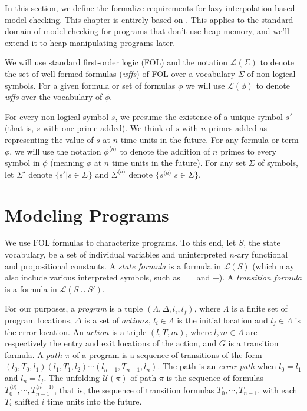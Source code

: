 \label{ch:background}

In this section, we define the formalize requirements for lazy interpolation-based model
checking. This chapter is entirely based on \cite{mcmillan06}. This applies to the
standard domain of model checking for programs that don't use heap memory, and we'll
extend it to heap-manipulating programs later.

We will use standard first-order logic (FOL) and the notation $\mathcal{L}(\Sigma)$ to
denote the set of well-formed formulas (\textit{wffs}) of FOL over a vocabulary $\Sigma$
of non-logical symbols. For a given formula or set of formulas $\phi$ we will use
$\mathcal{L}(\phi)$ to denote \textit{wffs} over the vocabulary of $\phi$.

For every non-logical symbol $s$, we presume the existence of a unique symbol $s'$ (that
is, $s$ with one prime added). We think of $s$ with $n$ primes added as representing the
value of $s$ at $n$ time units in the future. For any formula or term $\phi$, we will use
the notation $\phi^{\langle n \rangle}$ to denote the addition of $n$ primes to every
symbol in $\phi$ (meaning $\phi$ at $n$ time units in the future). For any set $\Sigma$ of
symbols, let $\Sigma'$ denote $\{ s' | s \in \Sigma \}$ and $\Sigma^{\langle n \rangle}$
denote $\{ s^{\langle n \rangle} | s \in \Sigma \}$.

\section{Modeling Programs}
\label{sec:modeling-programs}

We use FOL formulas to characterize programs. To this end, let $S$, the state vocabulary,
be a set of individual variables and uninterpreted $n$-ary functional and propositional
constants. A \textit{state formula} is a formula in $\mathcal{L}(S)$ (which may also
include various interpreted symbols, such as $=$ and $+$). A \textit{transition formula}
is a formula in $\mathcal{L}(S \cup S')$.

For our purposes, a \textit{program} is a tuple $(\Lambda, \Delta, l_i, l_f)$, where
$\Lambda$ is a finite set of program locations, $\Delta$ is a set of $actions$,
$l_i \in \Lambda$ is the initial location and $l_f \in \Lambda$ is the error location.
An $action$ is a triple $(l, T, m)$, where $l,m \in \Lambda$ are respectively the entry
and exit locations of the action, and $G$ is a transition formula. A $path$ $\pi$ of a
program is a sequence of transitions of the form
$(l_0, T_0, l_1)(l_1, T_1, l_2) \cdots (l_{n-1}, T_{n-1}, l_n)$. The path is an
\textit{error path} when $l_0 = l_1$ and $l_n = l_f$. The unfolding $\mathcal{U}(\pi)$ of
path $\pi$ is the sequence of formulas
$T_0^{\langle 0 \rangle}, \cdots, T_{n-1}^{\langle n-1 \rangle}$, that is, the sequence of
transition formulas $T_0, \cdots, T_{n-1}$, with each $T_i$ shifted $i$ time units into
the future.

